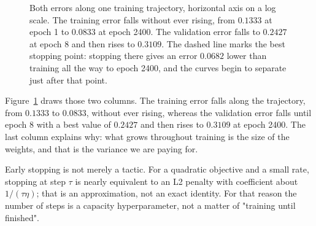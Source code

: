 \begin{figure}[htbp]
\centering
{}
\caption{Both errors along one training trajectory, horizontal axis on a log scale.
The training error falls without ever rising, from $0.1333$ at epoch 1 to $0.0833$
at epoch 2400. The validation error falls to $0.2427$ at epoch 8 and then rises to
$0.3109$. The dashed line marks the best stopping point: stopping there gives an
error $0.0682$ lower than training all the way to epoch 2400, and the curves begin to
separate just after that point.}
\label{fig:dua-kurva}
\end{figure}

Figure~\ref{fig:dua-kurva} draws those two columns. The training error falls along
the trajectory, from $0.1333$ to $0.0833$, without ever rising, whereas the
validation error falls until epoch 8 with a best value of $0.2427$ and then rises to
$0.3109$ at epoch 2400. The last column explains why: what grows throughout training
is the size of the weights, and that is the variance we are paying for.

Early stopping is not merely a tactic. For a quadratic objective and a small rate,
stopping at step $\tau$ is nearly equivalent to an L2 penalty with coefficient about
$1/(\tau\eta)$; that is an approximation, not an exact identity. For that reason the
number of steps is a capacity hyperparameter, not a matter of "training until
finished".

